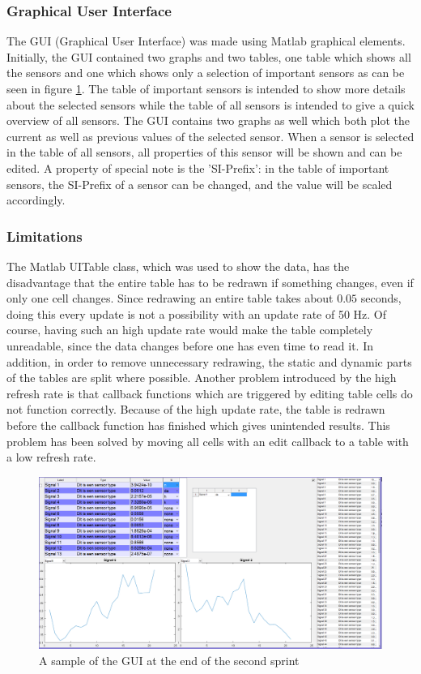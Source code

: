 \subsubsection{Graphical User Interface}
\label{sec:GUIS1}
The GUI (Graphical User Interface) was made using Matlab graphical elements. Initially, the GUI contained two graphs and two tables, one table which shows all the sensors and one which shows only a selection of important sensors as can be seen in figure \ref{fig:GUIV1}.
The table of important sensors is intended to show more details about the selected sensors while the table of all sensors is intended to give a quick overview of all sensors. The GUI contains two graphs as well which both plot the current as well as previous values of the selected sensor. When a sensor is selected in the table of all sensors, all properties of this sensor will be shown and can be edited. A property of special note is the 'SI-Prefix': in the table of important sensors, the SI-Prefix of a sensor can be changed, and the value will be scaled accordingly. 

\subsubsection{Limitations}
\label{sec:LimS1}
The Matlab UITable class, which was used to show the data, has the disadvantage that the entire table has to be redrawn if something changes, even if only one cell changes. Since redrawing an entire table takes about $0.05$ seconds, 
doing this every update is not a possibility with an update rate of 50 Hz. Of course, having such an high update rate would make the table completely unreadable, since the data changes before one has even time to read it. In addition, in order to remove unnecessary redrawing, the static and dynamic parts of the tables are split where possible. Another problem introduced by the high refresh rate is that callback functions which are triggered by editing table cells do not function correctly. Because of the high update rate, the table is redrawn before the callback function has finished which gives unintended results. This problem has been solved by moving all cells with an edit callback to a table with a low refresh rate. 

\begin{figure}[H]
	\centering
	\includegraphics[width=.75\textwidth]{images/GUIV1}
	\caption{A sample of the GUI at the end of the second sprint} 
	\label{fig:GUIV1}
\end{figure} 

